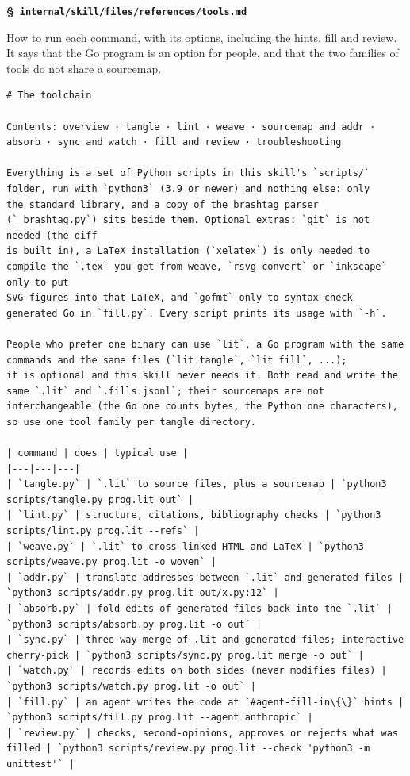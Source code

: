 \documentclass[10pt,a4paper]{article}
\newcounter{chunk}
\renewcommand{\thechunk}{\S\arabic{chunk}}
\newcommand{\chunkhead}[2]{\par\addvspace{1.2ex}\noindent\refstepcounter{chunk}\label{#1}{\bfseries\thechunk}\enspace #2\par\nopagebreak}
\newcommand{\filebadge}{{\footnotesize\itshape\color{tuftegray}file}}
\begin{document}
\chunkhead{chunk284}{\filebadge\ \textbf{\texttt{internal/\allowbreak{}skill/\allowbreak{}files/\allowbreak{}references/\allowbreak{}tools.\allowbreak{}md}}}
How to run each command, with its options, including the hints, fill and review. It says that the Go program is an option for people, and that the two families of tools do not share a sourcemap.
\begin{Verbatim}
# The toolchain

Contents: overview · tangle · lint · weave · sourcemap and addr · absorb · sync and watch · fill and review · troubleshooting

Everything is a set of Python scripts in this skill's `scripts/` folder, run with `python3` (3.9 or newer) and nothing else: only
the standard library, and a copy of the brashtag parser (`_brashtag.py`) sits beside them. Optional extras: `git` is not needed (the diff
is built in), a LaTeX installation (`xelatex`) is only needed to compile the `.tex` you get from weave, `rsvg-convert` or `inkscape` only to put
SVG figures into that LaTeX, and `gofmt` only to syntax-check generated Go in `fill.py`. Every script prints its usage with `-h`.

People who prefer one binary can use `lit`, a Go program with the same commands and the same files (`lit tangle`, `lit fill`, ...);
it is optional and this skill never needs it. Both read and write the same `.lit` and `.fills.jsonl`; their sourcemaps are not
interchangeable (the Go one counts bytes, the Python one characters), so use one tool family per tangle directory.

| command | does | typical use |
|---|---|---|
| `tangle.py` | `.lit` to source files, plus a sourcemap | `python3 scripts/tangle.py prog.lit out` |
| `lint.py` | structure, citations, bibliography checks | `python3 scripts/lint.py prog.lit --refs` |
| `weave.py` | `.lit` to cross-linked HTML and LaTeX | `python3 scripts/weave.py prog.lit -o woven` |
| `addr.py` | translate addresses between `.lit` and generated files | `python3 scripts/addr.py prog.lit out/x.py:12` |
| `absorb.py` | fold edits of generated files back into the `.lit` | `python3 scripts/absorb.py prog.lit -o out` |
| `sync.py` | three-way merge of .lit and generated files; interactive cherry-pick | `python3 scripts/sync.py prog.lit merge -o out` |
| `watch.py` | records edits on both sides (never modifies files) | `python3 scripts/watch.py prog.lit -o out` |
| `fill.py` | an agent writes the code at `#agent-fill-in\{\}` hints | `python3 scripts/fill.py prog.lit --agent anthropic` |
| `review.py` | checks, second-opinions, approves or rejects what was filled | `python3 scripts/review.py prog.lit --check 'python3 -m unittest'` |


\end{Verbatim}
\end{document}
